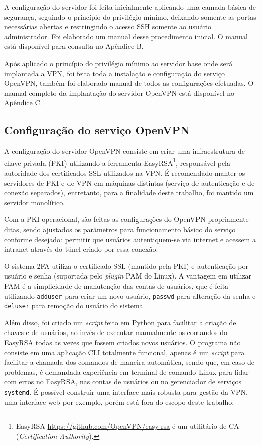     A configuração do servidor foi feita inicialmente aplicando uma camada básica de segurança, seguindo o princípio do privilégio mínimo, deixando somente as portas necessárias abertas e restringindo o acesso SSH somente ao usuário administrador. Foi elaborado um manual desse procedimento inicial. O manual está disponível para consulta no Apêndice B.
    
    Após aplicado o princípio do privilégio mínimo ao servidor base onde será implantada a VPN, foi feita toda a instalação e configuração do serviço OpenVPN, também foi elaborado manual de todos as configurações efetuadas. O manual completo da implantação do servidor OpenVPN está disponível no Apêndice C.
    
\subsection{Configuração do serviço OpenVPN}
    
    A configuração do servidor OpenVPN consiste em criar uma infraestrutura de chave privada (PKI) utilizando a ferramenta EasyRSA\footnote{EasyRSA \url{https://github.com/OpenVPN/easy-rsa} é um utilitário de CA (\textit{Certification Authority}).}, responsável pela autoridade dos certificados SSL utilizados na VPN. É recomendado manter os servidores de PKI e de VPN em máquinas distintas (serviço de autenticação e de conexão separados), entretanto, para a finalidade deste trabalho, foi mantido um servidor monolítico.
    
    Com a PKI operacional, são feitas as configurações do OpenVPN propriamente ditas, sendo ajustados os parâmetros para funcionamento básico do serviço conforme desejado: permitir que usuários autentiquem-se via internet e acessem a intranet através do túnel criado por essa conexão.
    
    O sistema 2FA utiliza o certificado SSL (mantido pela PKI) e autenticação por usuário e senha (suportada pelo \textit{plugin} PAM do Linux). A vantagem em utilizar PAM é a simplicidade de manutenção das contas de usuários, que é feita utilizando {\tt adduser} para criar um novo usuário, {\tt passwd} para alteração da senha e {\tt deluser} para remoção do usuário do sistema.
    
    Além disso, foi criado um \textit{script} feito em Python para facilitar a criação de chaves e de usuários, ao invés de executar manualmente os comandos do EasyRSA todas as vezes que fossem criados novos usuários. O programa não consiste em uma aplicação CLI totalmente funcional, apenas é um \textit{script} para facilitar a chamada dos comandos de maneira automática, sendo que, em caso de problemas, é demandada experiência em terminal de comando Linux para lidar com erros no EasyRSA, nas contas de usuários ou no gerenciador de serviços {\tt systemd}. É possível construir uma interface mais robusta para gestão da VPN, uma interface web por exemplo, porém está fora do escopo deste trabalho.
    

